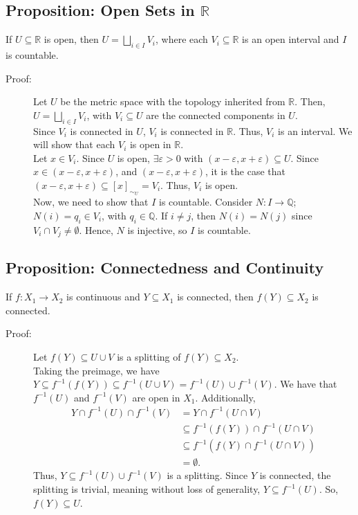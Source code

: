 \documentclass[9pt]{extarticle}
\newcommand{\Q}{\mathbb{Q}}
\newcommand{\R}{\mathbb{R}}
\begin{document}
  \subsection{Proposition: Open Sets in $\R$}%
  If $U\subseteq \R$ is open, then $U = \bigsqcup_{i\in I}V_i$, where each $V_i\subseteq \R$ is an open interval and $I$ is countable.
  \begin{description}
    \item[Proof:] Let $U$ be the metric space with the topology inherited from $\R$. Then, $U = \bigsqcup_{i\in I}V_i$, with $V_i \subseteq U$ are the connected components in $U$.\\

      Since $V_i$ is connected in $U$, $V_i$ is connected in $\R$. Thus, $V_i$ is an interval. We will show that each $V_i$ is open in $\R$.\\

      Let $x\in V_i$. Since $U$ is open, $\exists \varepsilon > 0$ with $(x-\varepsilon,x+\varepsilon)\subseteq U$. Since $x\in (x-\varepsilon,x+\varepsilon)$, and $(x-\varepsilon,x+\varepsilon)$, it is the case that $(x-\varepsilon,x+\varepsilon)\subseteq [x]_{\sim_U} = V_i$. Thus, $V_i$ is open.\\

      Now, we need to show that $I$ is countable. Consider $N: I\rightarrow \Q$; $N(i) = q_i\in V_i$, with $q_i\in \Q$. If $i\neq j$, then $N(i) = N(j)$ since $V_i\cap V_j \neq \emptyset$. Hence, $N$ is injective, so $I$ is countable.
  \end{description}
  \subsection{Proposition: Connectedness and Continuity}%
  If $f: X_1\rightarrow X_2$ is continuous and $Y\subseteq X_1$ is connected, then $f(Y)\subseteq X_2$ is connected.
  \begin{description}
    \item[Proof:] Let $f(Y)\subseteq U\cup V$ is a splitting of $f(Y)\subseteq X_2$.\\

      Taking the preimage, we have $Y\subseteq f^{-1}(f(Y))\subseteq f^{-1}(U\cup V) = f^{-1}(U)\cup f^{-1}(V)$. We have that $f^{-1}(U)$ and $f^{-1}(V)$ are open in $X_1$. Additionally,
      \begin{align*}
        Y\cap f^{-1}(U)\cap f^{-1}(V) &= Y\cap f^{-1}(U\cap V)\\
                                      &\subseteq f^{-1}\left(f(Y)\right)\cap f^{-1}(U\cap V)\\
                                      &\subseteq f^{-1}\left(f(Y)\cap f^{-1}(U\cap V)\right)\\
                                      &= \emptyset.
      \end{align*}
      Thus, $Y\subseteq f^{-1}(U)\cup f^{-1}(V)$ is a splitting. Since $Y$ is connected, the splitting is trivial, meaning without loss of generality, $Y\subseteq f^{-1}(U)$. So, $f(Y)\subseteq U$.
  \end{description}
\end{document}
